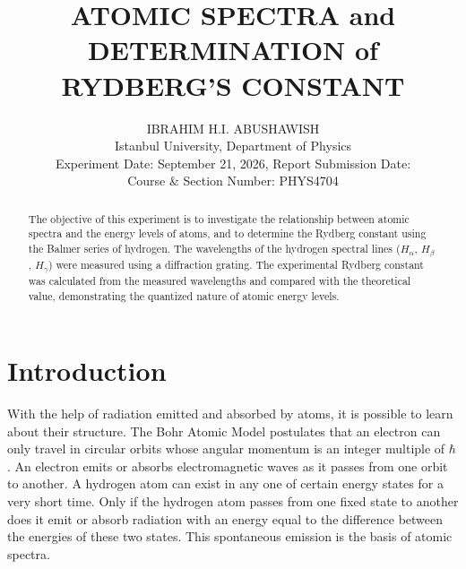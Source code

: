 \documentclass[journal]{IEEEtran}
\begin{document}
\title{ATOMIC SPECTRA and DETERMINATION of RYDBERG'S CONSTANT}
\author{IBRAHIM H.I. ABUSHAWISH \\
Istanbul University, Department of Physics \\
Experiment Date: September 21, 2026, Report Submission Date: \\
Course \& Section Number: PHYS4704}


\maketitle

\begin{abstract}
The objective of this experiment is to investigate the relationship between atomic spectra and the energy levels of atoms, and to determine the Rydberg constant using the Balmer series of hydrogen. The wavelengths of the hydrogen spectral lines ($H_\alpha$, $H_\beta$, $H_\gamma$) were measured using a diffraction grating. The experimental Rydberg constant was calculated from the measured wavelengths and compared with the theoretical value, demonstrating the quantized nature of atomic energy levels.
\end{abstract}

\section{Introduction}
With the help of radiation emitted and absorbed by atoms, it is possible to learn about their structure. The Bohr Atomic Model postulates that an electron can only travel in circular orbits whose angular momentum is an integer multiple of $\hbar$. An electron emits or absorbs electromagnetic waves as it passes from one orbit to another. A hydrogen atom can exist in any one of certain energy states for a very short time. Only if the hydrogen atom passes from one fixed state to another does it emit or absorb radiation with an energy equal to the difference between the energies of these two states. This spontaneous emission is the basis of atomic spectra. 

\end{document}
